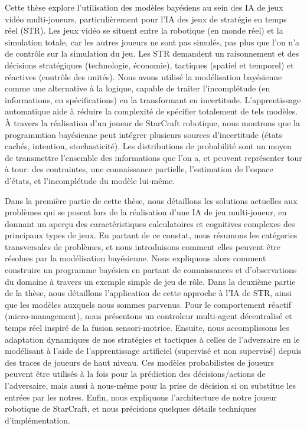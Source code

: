 Cette thèse explore l'utilisation des modèles bayésiens au sein des IA de jeux vidéo multi-joueurs, particulièrement pour l'IA des jeux de stratégie en temps réel (STR). Les jeux vidéo se situent entre la robotique (en monde réel) et la simulation totale, car les autres joueurs ne sont pas simulés, pas plus que l'on n'a de contrôle sur la simulation du jeu. Les STR demandent un raisonnement et des décisions stratégiques (technologie, économie), tactiques (spatiel et temporel) et réactives (contrôle des unités). Nous avons utilisé la modélisation bayésienne comme une alternative à la logique, capable de traiter l'incomplétude (en informations, en spécifications) en la transformant en incertitude. L'apprentissage automatique aide à réduire la complexité de spécifier totalement de tels modèles. À travers la réalisation d'un joueur de StarCraft robotique, nous montrons que la programmtion bayésienne peut intégrer plusieurs sources d'incertitude (états cachés, intention, stochasticité). Les distributions de probabilité sont un moyen de transmettre l'ensemble des informations que l'on a, et peuvent représenter tour à tour: des contraintes, une connaissance partielle, l'estimation de l'espace d'états, et l'incomplétude du modèle lui-même.

Dans la première partie de cette thèse, nous détaillons les solutions actuelles aux problèmes qui se posent lors de la réalisation d'une IA de jeu multi-joueur, en donnant un aperçu des caractéristiques calculatoires et cognitives complexes des principaux types de jeux. En partant de ce constat, nous résumons les catégories transversales de problèmes, et nous introduisons comment elles peuvent être résolues par la modélisation bayésienne. Nous expliquons alors comment construire un programme bayésien en partant de connaissances et d'observations du domaine à travers un exemple simple de jeu de rôle. Dans la deuxième partie de la thèse, nous détaillons l'application de cette approche à l'IA de STR, ainsi que les modèles auxquels nous sommes parvenus. Pour le comportement réactif (micro-management), nous présentons un controleur multi-agent décentralisé et temps réel inspiré de la fusion sensori-motrice. Ensuite, nous accomplissons les adaptation dynamiques de nos stratégies et tactiques à celles de l'adversaire en le modélisant à l'aide de l'apprentissage artificiel (supervisé et non supervisé) depuis des traces de joueurs de haut niveau. Ces modèles probabilistes de joueurs peuvent être utilisés à la fois pour la prédiction des décisions/actions de l'adversaire, mais aussi à nous-même pour la prise de décision si on substitue les entrées par les notres. Enfin, nous expliquons l'architecture de notre joueur robotique de StarCraft, et nous précisions quelques détails techniques d'implémentation.

